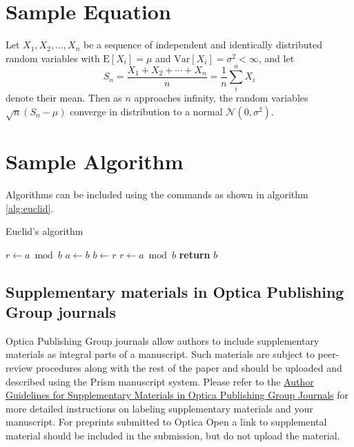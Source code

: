 \documentclass[9pt,twocolumn,twoside]{opticajnl}
\begin{document}
\section{Sample Equation}

Let $X_1, X_2, \ldots, X_n$ be a sequence of independent and identically distributed random variables with $\text{E}[X_i] = \mu$ and $\text{Var}[X_i] = \sigma^2 < \infty$, and let
\begin{equation}
S_n = \frac{X_1 + X_2 + \cdots + X_n}{n}
      = \frac{1}{n}\sum_{i}^{n} X_i
\label{eq:refname1}
\end{equation}
denote their mean. Then as $n$ approaches infinity, the random variables $\sqrt{n}(S_n - \mu)$ converge in distribution to a normal $\mathcal{N}(0, \sigma^2)$.

\section{Sample Algorithm}

Algorithms can be included using the commands as shown in algorithm \ref{alg:euclid}.

\begin{algorithm}
\caption{Euclid’s algorithm}\label{alg:euclid}
\begin{algorithmic}[1]
\State $r\gets a\bmod b$
\State $a\gets b$
\State $b\gets r$
\State $r\gets a\bmod b$
\EndWhile\label{euclidendwhile}
\State \textbf{return} $b$
\EndProcedure
\end{algorithmic}
\end{algorithm}

\subsection{Supplementary materials in Optica Publishing Group journals}
Optica Publishing Group journals allow authors to include supplementary materials as integral parts of a manuscript. Such materials are subject to peer-review procedures along with the rest of the paper and should be uploaded and described using the Prism manuscript system. Please refer to the \href{https://opg.optica.org/submit/style/supplementary_materials.cfm}{Author Guidelines for Supplementary Materials in Optica Publishing Group Journals} for more detailed instructions on labeling supplementary materials and your manuscript. For preprints submitted to Optica Open a link to supplemental material should be included in the submission, but do not upload the material.
\end{document}
